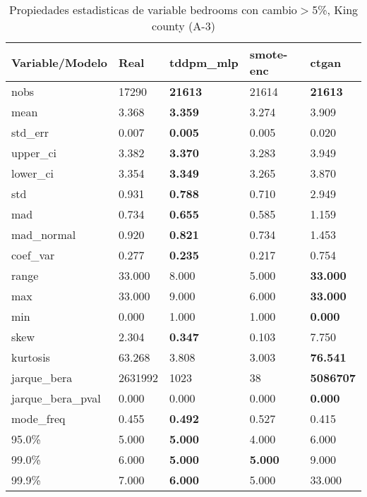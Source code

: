 \begin{table}[H]
\centering
\fontsize{8}{14}\selectfont
\caption{Propiedades estadisticas de variable bedrooms con cambio\ensuremath{>}5\%, King county (A-3)}
\label{table-stats-king county-a-3-bedrooms-short}
\begin{tabular}{|l|m{10em}|m{10em}|m{10em}|m{10em}|}
\hline
 \rowcolor[gray]{0.8}
Variable/Modelo & Real & tddpm\_mlp & smote-enc & ctgan \\
\hline nobs & 17290 & \bfseries 21613 & \cellcolor[rgb]{0.9, 0.54, 0.52} 21614 & \bfseries 21613 \\
\hline mean & 3.368 & \bfseries 3.359 & 3.274 & \cellcolor[rgb]{0.9, 0.54, 0.52} 3.909 \\
\hline std\_err & 0.007 & \bfseries 0.005 & 0.005 & \cellcolor[rgb]{0.9, 0.54, 0.52} 0.020 \\
\hline upper\_ci & 3.382 & \bfseries 3.370 & 3.283 & \cellcolor[rgb]{0.9, 0.54, 0.52} 3.949 \\
\hline lower\_ci & 3.354 & \bfseries 3.349 & 3.265 & \cellcolor[rgb]{0.9, 0.54, 0.52} 3.870 \\
\hline std & 0.931 & \bfseries 0.788 & 0.710 & \cellcolor[rgb]{0.9, 0.54, 0.52} 2.949 \\
\hline mad & 0.734 & \bfseries 0.655 & 0.585 & \cellcolor[rgb]{0.9, 0.54, 0.52} 1.159 \\
\hline mad\_normal & 0.920 & \bfseries 0.821 & 0.734 & \cellcolor[rgb]{0.9, 0.54, 0.52} 1.453 \\
\hline coef\_var & 0.277 & \bfseries 0.235 & 0.217 & \cellcolor[rgb]{0.9, 0.54, 0.52} 0.754 \\
\hline range & 33.000 & 8.000 & \cellcolor[rgb]{0.9, 0.54, 0.52} 5.000 & \bfseries 33.000 \\
\hline max & 33.000 & 9.000 & \cellcolor[rgb]{0.9, 0.54, 0.52} 6.000 & \bfseries 33.000 \\
\hline min & 0.000 & \cellcolor[rgb]{0.9, 0.54, 0.52} 1.000 & \cellcolor[rgb]{0.9, 0.54, 0.52} 1.000 & \bfseries 0.000 \\
\hline skew & 2.304 & \bfseries 0.347 & 0.103 & \cellcolor[rgb]{0.9, 0.54, 0.52} 7.750 \\
\hline kurtosis & 63.268 & 3.808 & \cellcolor[rgb]{0.9, 0.54, 0.52} 3.003 & \bfseries 76.541 \\
\hline jarque\_bera & 2631992 & 1023 & \cellcolor[rgb]{0.9, 0.54, 0.52} 38 & \bfseries 5086707 \\
\hline jarque\_bera\_pval & 0.000 & 0.000 & \cellcolor[rgb]{0.9, 0.54, 0.52} 0.000 & \bfseries 0.000 \\
\hline mode\_freq & 0.455 & \bfseries 0.492 & \cellcolor[rgb]{0.9, 0.54, 0.52} 0.527 & 0.415 \\
\hline 95.0\% & 5.000 & \bfseries 5.000 & \cellcolor[rgb]{0.9, 0.54, 0.52} 4.000 & \cellcolor[rgb]{0.9, 0.54, 0.52} 6.000 \\
\hline 99.0\% & 6.000 & \bfseries 5.000 & \bfseries 5.000 & \cellcolor[rgb]{0.9, 0.54, 0.52} 9.000 \\
\hline 99.9\% & 7.000 & \bfseries 6.000 & 5.000 & \cellcolor[rgb]{0.9, 0.54, 0.52} 33.000 \\
\hline
\end{tabular}
\end{table}
